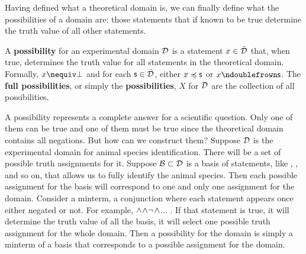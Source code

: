 \documentclass[11pt,letterpaper,fleqn]{memoir} %
\begin{document}
Having defined what a theoretical domain is, we can finally define what the possibilities of a domain are: those statements that if known to be true determine the truth value of all other statements.

\begin{mathSection}

\begin{defn}\label{1_def_possibilities}
	A \textbf{possibility} for an experimental domain $\mathcal{D}$ is a statement $x \in \bar{\mathcal{D}}$ that, when true, determines the truth value for all statements in the theoretical domain. Formally, $x \nequiv \impossibility$ and for each $\mathsf{s} \in \bar{\mathcal{D}}$, either $x \preccurlyeq \mathsf{s}$ or $x \ncomp \mathsf{s}$. The \textbf{full possibilities}, or simply the \textbf{possibilities}, $X$ for $\mathcal{D}$ are the collection of all possibilities.
\end{defn}

\end{mathSection}

A possibility represents a complete answer for a scientific question. Only one of them can be true and one of them must be true since the theoretical domain contains all negations. But how can we construct them? Suppose $\mathcal{D}$ is the experimental domain for animal species identification. There will be a set of possible truth assignments for it. Suppose $\mathcal{B} \subset \mathcal{D}$ is a basis of statements, like , ,  and so on, that allows us to fully identify the animal species. Then each possible assignment for the basis will correspond to one and only one assignment for the domain. Consider a minterm, a conjunction where each statement appears once either negated or not. For example, $\wedge$$\wedge\neg$$\wedge$... . If that statement is true, it will determine the truth value of all the basis, it will select one possible truth assignment for the whole domain. Then a possibility for the domain is simply a minterm of a basis that corresponds to a possible assignment for the domain.
\end{document}

